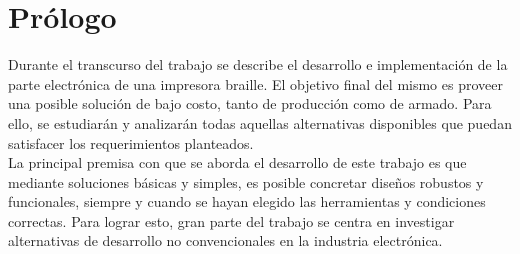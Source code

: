 \chapter*{Pr\'ologo}

Durante el transcurso del trabajo se describe el desarrollo e implementaci\'on
de la parte electr\'onica de una impresora braille. El objetivo final del
mismo es proveer una posible soluci\'on de bajo costo, tanto de producci\'on
como de armado. Para ello, se estudiar\'an y analizar\'an todas aquellas
alternativas disponibles que puedan satisfacer los requerimientos
planteados.\\

La principal premisa con que se aborda el desarrollo de este trabajo es que
mediante soluciones b\'asicas y simples, es posible concretar dise\~nos
robustos y funcionales, siempre y cuando se hayan elegido las herramientas y
condiciones correctas. Para lograr esto, gran parte del trabajo se centra en
investigar alternativas de desarrollo no convencionales en la industria
electr\'onica.

